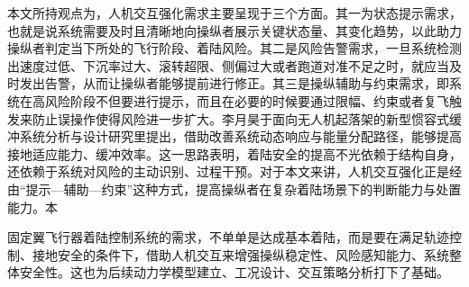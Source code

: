 本文所持观点为，人机交互强化需求主要呈现于三个方面。其一为状态提示需求，也就是说系统需要及时且清晰地向操纵者展示关键状态量、其变化趋势，以此助力操纵者判定当下所处的飞行阶段、着陆风险。其二是风险告警需求，一旦系统检测出速度过低、下沉率过大、滚转超限、侧偏过大或者跑道对准不足之时，就应当及时发出告警，从而让操纵者能够提前进行修正。其三是操纵辅助与约束需求，即系统在高风险阶段不但要进行提示，而且在必要的时候要通过限幅、约束或者复飞触发来防止误操作使得风险进一步扩大。李月昊于面向无人机起落架的新型惯容式缓冲系统分析与设计研究里提出，借助改善系统动态响应与能量分配路径，能够提高接地适应能力、缓冲效率。这一思路表明，着陆安全的提高不光依赖于结构自身，还依赖于系统对风险的主动识别、过程干预。对于本文来讲，人机交互强化正是经由``提示---辅助---约束''这种方式，提高操纵者在复杂着陆场景下的判断能力与处置能力。本

固定翼飞行器着陆控制系统的需求，不单单是达成基本着陆，而是要在满足轨迹控制、接地安全的条件下，借助人机交互来增强操纵稳定性、风险感知能力、系统整体安全性。这也为后续动力学模型建立、工况设计、交互策略分析打下了基础。

